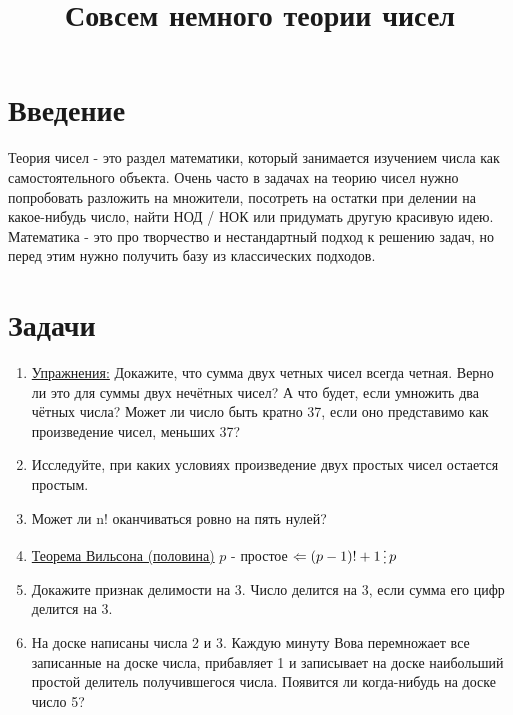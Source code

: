 \documentclass[a4paper,12pt]{article}
\title{Совсем немного теории чисел}
\begin{document}
\maketitle

\section*{Введение}
Теория чисел - это раздел математики, который занимается изучением числа как самостоятельного объекта. Очень часто в задачах на теорию чисел нужно попробовать разложить на множители, посотреть на остатки при делении на какое-нибудь число, найти НОД / НОК или придумать другую красивую идею. Математика - это про творчество и нестандартный подход к решению задач, но перед этим нужно получить базу из классических подходов.

\section*{Задачи}

\begin{enumerate}[label=\textbf{\arabic*.}]
    \item  \underline{Упражнения:} Докажите, что сумма двух четных чисел всегда четная. Верно ли это для суммы двух нечётных чисел? А что будет, если умножить два чётных числа? Может ли число быть кратно 37, если оно представимо как произведение чисел, меньших 37?
    
    \item Исследуйте, при каких условиях произведение двух простых чисел остается простым.
    
    \item Может ли n! оканчиваться ровно на пять нулей?
    
    \item  \underline{Теорема Вильсона (половина)} $p$ - простое $ \Leftarrow{} (p - 1)! + 1 \mathop{\raisebox{-2pt}{\vdots}} p$

    \item Докажите признак делимости на 3. Число делится на 3, если сумма его цифр делится на 3.

    \item На доске написаны числа 2 и 3. Каждую минуту Вова перемножает все записанные на доске числа, прибавляет 1 и записывает на доске наибольший простой делитель получившегося числа. Появится ли когда-нибудь на доске число 5?
\end{enumerate}
\end{document}
